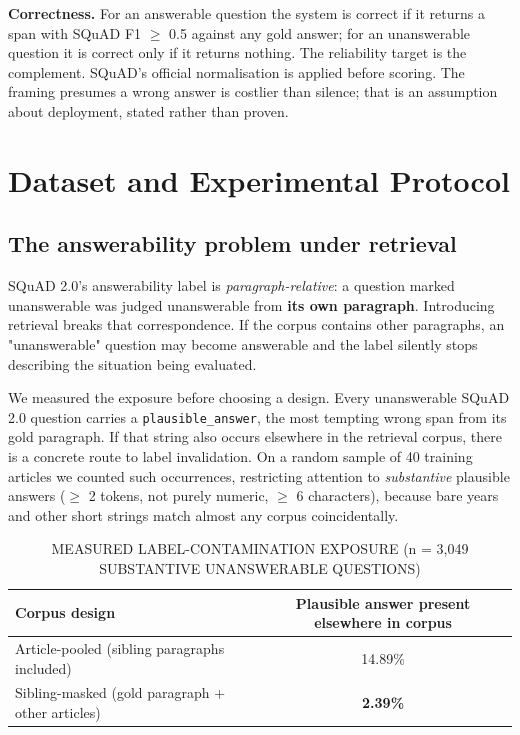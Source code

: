 \documentclass[conference]{IEEEtran}
\begin{document}
\textbf{Correctness.} For an answerable question the system is correct if it returns a span with SQuAD F1 $\geq$ 0.5 against any gold answer; for an unanswerable question it is correct only if it returns nothing. The reliability target is the complement. SQuAD's official normalisation is applied before scoring. The framing presumes a wrong answer is costlier than silence; that is an assumption about deployment, stated rather than proven.

\section{Dataset and Experimental Protocol}

\subsection{The answerability problem under retrieval}

SQuAD 2.0's answerability label is \emph{paragraph-relative}: a question marked unanswerable was judged unanswerable from \textbf{its own paragraph}. Introducing retrieval breaks that correspondence. If the corpus contains other paragraphs, an "unanswerable" question may become answerable and the label silently stops describing the situation being evaluated.

We measured the exposure before choosing a design. Every unanswerable SQuAD 2.0 question carries a \texttt{plausible\_answer}, the most tempting wrong span from its gold paragraph. If that string also occurs elsewhere in the retrieval corpus, there is a concrete route to label invalidation. On a random sample of 40 training articles we counted such occurrences, restricting attention to \emph{substantive} plausible answers ($\geq$ 2 tokens, not purely numeric, $\geq$ 6 characters), because bare years and other short strings match almost any corpus coincidentally.

\begin{table}[t]\centering\caption{MEASURED LABEL-CONTAMINATION EXPOSURE (n = 3,049 SUBSTANTIVE UNANSWERABLE QUESTIONS)}\label{tab:1}\footnotesize
\begin{tabular}{lc}\hline
\textbf{Corpus design} & \textbf{Plausible answer present elsewhere in corpus} \\ \hline
Article-pooled (sibling paragraphs included) & 14.89\% \\
Sibling-masked (gold paragraph + other articles) & \textbf{2.39\%} \\
\hline\end{tabular}\end{table}
\end{document}
